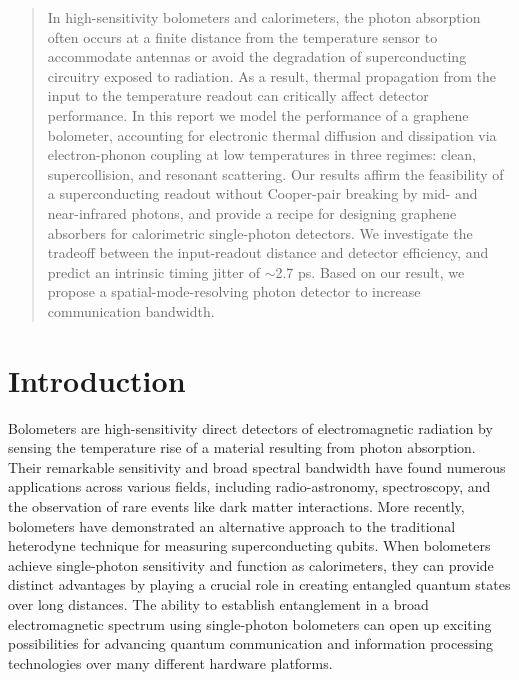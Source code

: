 \documentclass[aip, amsmath,amssymb, reprint]{revtex4-1}
\begin{document}
\begin{abstract}
In high-sensitivity bolometers and calorimeters, the photon absorption often occurs at a finite distance from the temperature sensor to accommodate antennas or avoid the degradation of superconducting circuitry exposed to radiation. As a result, thermal propagation from the input to the temperature readout can critically affect detector performance. In this report we model the performance of a graphene bolometer, accounting for electronic thermal diffusion and dissipation via electron-phonon coupling at low temperatures in three regimes: clean, supercollision, and resonant scattering. Our results affirm the feasibility of a superconducting readout without Cooper-pair breaking by mid- and near-infrared photons, and provide a recipe for designing graphene absorbers for calorimetric single-photon detectors. We investigate the tradeoff between the input-readout distance and detector efficiency, and predict an intrinsic timing jitter of $\sim$2.7 ps. Based on our result, we propose a spatial-mode-resolving photon detector to increase communication bandwidth.
\end{abstract}

\maketitle

\section{Introduction}
Bolometers are high-sensitivity direct detectors of electromagnetic radiation by sensing the temperature rise of a material resulting from photon absorption. Their remarkable sensitivity and broad spectral bandwidth have found numerous applications across various fields, including radio-astronomy, spectroscopy, and the observation of rare events like dark matter interactions\cite{Pirro.2017,Schütte-Engel.2021}. More recently, bolometers have demonstrated an alternative approach to the traditional heterodyne technique for measuring superconducting qubits\cite{Gunyhó.2023}. When bolometers achieve single-photon sensitivity and function as calorimeters, they can provide distinct advantages by playing a crucial role in creating entangled quantum states over long distances\cite{Couteau.2023}. The ability to establish entanglement in a broad electromagnetic spectrum using single-photon bolometers can open up exciting possibilities for advancing quantum communication and information processing technologies over many different hardware platforms.
\end{document}
